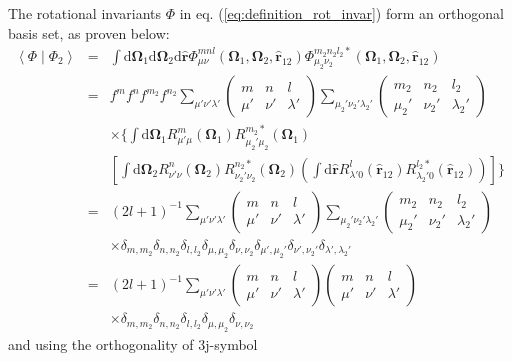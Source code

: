 The rotational invariants $\Phi$ in eq. (\ref{eq:definition_rot_invar})
form an orthogonal basis set, as proven below:
\begin{eqnarray}
\left\langle \Phi\mid\Phi_{2}\right\rangle  & = & \int\mathrm{d}\mathbf{\Omega}_{1}\mathrm{d}\mathbf{\Omega}_{2}\mathrm{d}\hat{\mathbf{r}}\Phi_{\mu\nu}^{mnl}(\mathbf{\Omega}_{1},\mathbf{\Omega}_{2},\mathbf{\hat{r}}_{12})\Phi_{\mu_{2}\nu_{2}}^{m_{2}n_{2}l_{2}*}(\mathbf{\Omega}_{1},\mathbf{\Omega}_{2},\mathbf{\hat{r}}_{12})\nonumber \\
 & = & f^{m}f^{n}f^{m_{2}}f^{n_{2}}\sum_{\mu'\nu'\lambda'}\left(\begin{array}{ccc}
m & n & l\\
\mu' & \nu' & \lambda'
\end{array}\right)\sum_{\mu_{2}'\nu_{2}'\lambda_{2}'}\left(\begin{array}{ccc}
m_{2} & n_{2} & l_{2}\\
\mu_{2}' & \nu_{2}' & \lambda_{2}'
\end{array}\right)\nonumber \\
 &  & \times\{\int\mathrm{d}\mathbf{\Omega}_{1}R_{\mu'\mu}^{m}(\mathbf{\Omega}_{1})R_{\mu_{2}'\mu_{2}}^{m_{2}*}(\mathbf{\Omega}_{1})\nonumber \\
 &  & \left[\int\mathrm{d}\mathbf{\Omega}_{2}R_{\nu'\nu}^{n}(\mathbf{\Omega}_{2})R_{\nu_{2}'\nu_{2}}^{n_{2}*}(\mathbf{\Omega}_{2})\left(\int\mathrm{d}\hat{\mathbf{r}}R_{\lambda'0}^{l}(\mathbf{\hat{r}}_{12})R_{\lambda_{2}'0}^{l_{2}*}(\mathbf{\hat{r}}_{12})\right)\right]\}\nonumber \\
 & = & \left(2l+1\right)^{-1}\sum_{\mu'\nu'\lambda'}\left(\begin{array}{ccc}
m & n & l\\
\mu' & \nu' & \lambda'
\end{array}\right)\sum_{\mu_{2}'\nu_{2}'\lambda_{2}'}\left(\begin{array}{ccc}
m_{2} & n_{2} & l_{2}\\
\mu_{2}' & \nu_{2}' & \lambda_{2}'
\end{array}\right)\nonumber \\
 &  & \times\delta_{m,m_{2}}\delta_{n,n_{2}}\delta_{l,l_{2}}\delta_{\mu,\mu_{2}}\delta_{\nu,\nu_{2}}\delta_{\mu',\mu_{2}'}\delta_{\nu',\nu_{2}'}\delta_{\lambda',\lambda_{2}'}\nonumber \\
 & = & \left(2l+1\right)^{-1}\sum_{\mu'\nu'\lambda'}\left(\begin{array}{ccc}
m & n & l\\
\mu' & \nu' & \lambda'
\end{array}\right)\left(\begin{array}{ccc}
m & n & l\\
\mu' & \nu' & \lambda'
\end{array}\right)\\
 &  & \times\delta_{m,m_{2}}\delta_{n,n_{2}}\delta_{l,l_{2}}\delta_{\mu,\mu_{2}}\delta_{\nu,\nu_{2}}
\end{eqnarray}
and using the orthogonality of 3j-symbol \citep{Edmonds}

